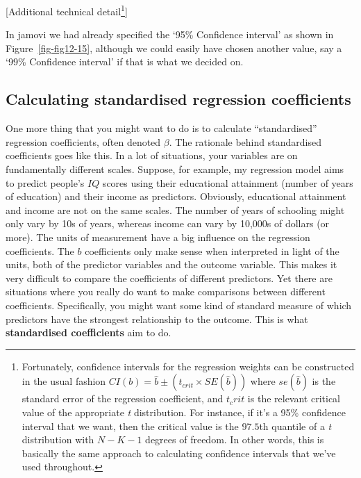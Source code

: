 \documentclass[
  a4paper,
]{book}
\begin{document}
{[}Additional technical detail\footnote{Fortunately, confidence
  intervals for the regression weights can be constructed in the usual
  fashion \(CI(b)=\hat{b} \pm (t_{crit} \times SE(\hat{b}))\) where
  \(se(\hat{b})\) is the standard error of the regression coefficient,
  and \(t_crit\) is the relevant critical value of the appropriate
  \emph{t} distribution. For instance, if it's a 95\% confidence
  interval that we want, then the critical value is the \(97.5\)th
  quantile of a \emph{t} distribution with \(N -K -1\) degrees of
  freedom. In other words, this is basically the same approach to
  calculating confidence intervals that we've used throughout.}{]}

In jamovi we had already specified the `95\% Confidence interval' as
shown in Figure~\ref{fig-fig12-15}, although we could easily have chosen
another value, say a `99\% Confidence interval' if that is what we
decided on.

\hypertarget{calculating-standardised-regression-coefficients}{%
\subsection{Calculating standardised regression
coefficients}\label{calculating-standardised-regression-coefficients}}

One more thing that you might want to do is to calculate
``standardised'' regression coefficients, often denoted \(\beta\). The
rationale behind standardised coefficients goes like this. In a lot of
situations, your variables are on fundamentally different scales.
Suppose, for example, my regression model aims to predict people's
\(IQ\) scores using their educational attainment (number of years of
education) and their income as predictors. Obviously, educational
attainment and income are not on the same scales. The number of years of
schooling might only vary by 10s of years, whereas income can vary by
10,000s of dollars (or more). The units of measurement have a big
influence on the regression coefficients. The \(b\) coefficients only
make sense when interpreted in light of the units, both of the predictor
variables and the outcome variable. This makes it very difficult to
compare the coefficients of different predictors. Yet there are
situations where you really do want to make comparisons between
different coefficients. Specifically, you might want some kind of
standard measure of which predictors have the strongest relationship to
the outcome. This is what \textbf{standardised coefficients} aim to do.
\end{document}
